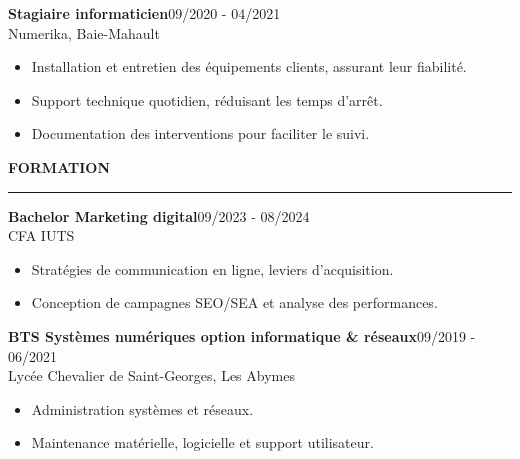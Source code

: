 \documentclass{article}
\newcommand{\cvsection}[1]{%
  \par\bigskip
  {\bfseries\Large #1}\par
  \noindent\rule{\linewidth}{0.8pt}\par\medskip}
\begin{document}
\begin{paracol}{2}
\colorbox{maincolor}{%
  \begin{minipage}{\linewidth}
    \noindent
    \textbf{Stagiaire informaticien}\hfill 09/2020 - 04/2021\\
    Numerika, Baie-Mahault\\[-0.3em]
    \begin{itemize}[leftmargin=*]
      \item Installation et entretien des équipements clients, assurant leur fiabilité. \item Support technique quotidien, réduisant les temps d’arrêt. \item Documentation des interventions pour faciliter le suivi.
    \end{itemize}
  \end{minipage}}

\cvsection{FORMATION}
\colorbox{maincolor}{%
  \begin{minipage}{\linewidth}
    \noindent
    \textbf{Bachelor Marketing digital}\hfill 09/2023 - 08/2024\\
    CFA IUTS\\[-0.3em]
    \begin{itemize}[leftmargin=*]
      \item Stratégies de communication en ligne, leviers d’acquisition. \item Conception de campagnes SEO/SEA et analyse des performances.
    \end{itemize}
  \end{minipage}}

\vspace{3mm}

\colorbox{maincolor}{%
  \begin{minipage}{\linewidth}
    \noindent
    \textbf{BTS Systèmes numériques option informatique \& réseaux}\hfill 09/2019 - 06/2021\\
    Lycée Chevalier de Saint-Georges, Les Abymes\\[-0.3em]
    \begin{itemize}[leftmargin=*]
      \item Administration systèmes et réseaux. \item Maintenance matérielle, logicielle et support utilisateur.
    \end{itemize}
  \end{minipage}}

\switchcolumn\color{white}\hspace*{0.4cm}\begin{minipage}{0.88\linewidth}


\end{minipage}
\end{paracol}
\end{document}
